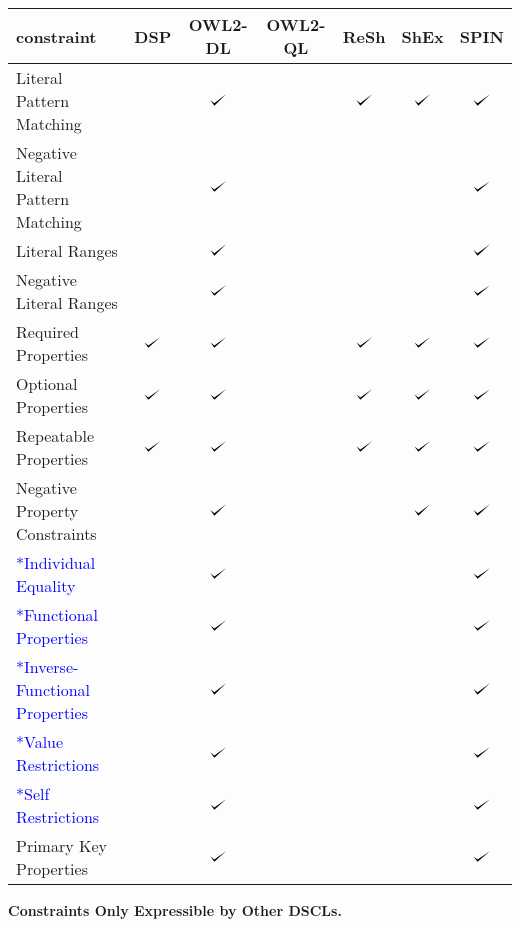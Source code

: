 \documentclass{llncs}
\def\checkmark{\tikz\fill[scale=0.4](0,.35) -- (.25,0) -- (1,.7) -- (.25,.15) -- cycle;}
\newenvironment{evaluation}{
  \scriptsize
  \sffamily
  \vspace{0.3cm}
  \begin{tabular}{l|c|c|c|c|c|c}
  \hline
  \textbf{constraint} & \textbf{DSP} & \textbf{OWL2-DL} & \textbf{OWL2-QL} & \textbf{ReSh} & \textbf{ShEx} & \textbf{SPIN} \\
  \hline

}{
  \hline
  \end{tabular}
  \linebreak
}
\begin{document}
\begin{evaluation}
Literal Pattern Matching & \ding{55} & $\checkmark$ & \ding{55} & $\checkmark$ & $\checkmark$ & $\checkmark$ \\
Negative Literal Pattern Matching & \ding{55} & $\checkmark$ & \ding{55} & & & $\checkmark$ \\
Literal Ranges & \ding{55} & $\checkmark$ & \ding{55} & \ding{55} & \ding{55} & $\checkmark$ \\
Negative Literal Ranges & \ding{55} & $\checkmark$ & \ding{55} & \ding{55} & \ding{55} & $\checkmark$ \\
Required Properties & $\checkmark$ & $\checkmark$ & \ding{55} & $\checkmark$ & $\checkmark$ & $\checkmark$ \\
Optional Properties & $\checkmark$ & $\checkmark$ & \ding{55} & $\checkmark$ & $\checkmark$ & $\checkmark$ \\
Repeatable Properties & $\checkmark$ & $\checkmark$ & \ding{55} & $\checkmark$ & $\checkmark$ & $\checkmark$ \\
Negative Property Constraints & \ding{55} & $\checkmark$ & \ding{55} & & $\checkmark$ & $\checkmark$ \\
\textcolor{blue}{*Individual Equality} & \ding{55} & $\checkmark$ & \ding{55} & \ding{55} & \ding{55} & $\checkmark$ \\
\textcolor{blue}{*Functional Properties} & \ding{55} & $\checkmark$ & \ding{55} & \ding{55} & \ding{55} & $\checkmark$ \\
\textcolor{blue}{*Inverse-Functional Properties} & \ding{55} & $\checkmark$ & \ding{55} & \ding{55} & \ding{55} & $\checkmark$ \\
\textcolor{blue}{*Value Restrictions} & & $\checkmark$ & \ding{55} & & & $\checkmark$ \\
\textcolor{blue}{*Self Restrictions} & \ding{55} & $\checkmark$ & \ding{55} & \ding{55} & \ding{55} & $\checkmark$ \\
Primary Key Properties & \ding{55} & $\checkmark$ & \ding{55} & \ding{55} & \ding{55} & $\checkmark$ \\
\end{evaluation}

\textbf{Constraints Only Expressible by Other DSCLs.}
\end{document}
